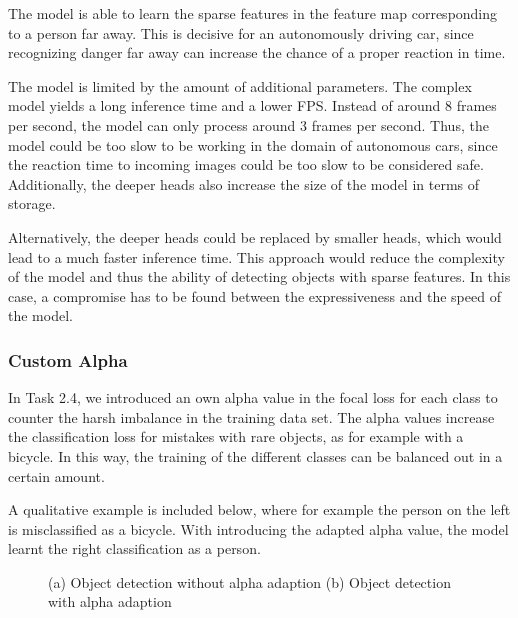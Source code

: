 \documentclass{article}
\begin{document}
The model is able to learn the sparse features in the feature map corresponding to a person far away. This is decisive for an autonomously driving car, since recognizing danger far away can increase the chance of a proper reaction in time.

The model is limited by the amount of additional parameters. The complex model yields a long inference time and a lower FPS. Instead of around 8 frames per second, the model can only process around 3 frames per second. Thus, the model could be too slow to be working in the domain of autonomous cars, since the reaction time to incoming images could be too slow to be considered safe. Additionally, the deeper heads also increase the size of the model in terms of storage.

Alternatively, the deeper heads could be replaced by smaller heads, which would lead to a much faster inference time. This approach would reduce the complexity of the model and thus the ability of detecting objects with sparse features. In this case, a compromise has to be found between the expressiveness and the speed of the model.

\subsubsection*{Custom Alpha}

In Task 2.4, we introduced an own alpha value in the focal loss for each class to counter the harsh imbalance in the training data set. The alpha values increase the classification loss for mistakes with rare objects, as for example with a bicycle. In this way, the training of the different classes can be balanced out in a certain amount.

A qualitative example is included below, where for example the person on the left is misclassified as a bicycle. With introducing the adapted alpha value, the model learnt the right classification as a person.

\begin{figure}[t!]
    \centering
    \label{fig:comparison3}
    \caption{(a) Object detection without alpha adaption (b)  Object detection with alpha adaption}
\end{figure}
\end{document}
